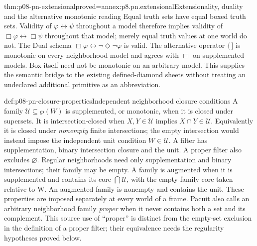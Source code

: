 \begin{hblemma}{thm:p08-pn-extensional}{proved=annex:p8.pn.extensional}{Extensionality, duality and the alternative monotonic reading}
Equal truth sets have equal boxed truth sets. Validity of
\(\varphi\leftrightarrow\psi\) throughout a model therefore
implies validity of \(\Box\varphi\leftrightarrow\Box\psi\)
throughout that model; merely equal truth values at one world do not.
The Dual schema \(\Box\varphi\leftrightarrow\neg\Diamond\neg\varphi\)
is valid. The alternative operator \(\langle\ ]\) is monotonic
on every neighborhood model and agrees with \(\Box\) on supplemented
models. Box itself need not be monotonic on an arbitrary model.
This supplies the semantic bridge to the existing defined-diamond sheets
without treating an undeclared additional primitive as an abbreviation.
\end{hblemma}

\begin{hbdefinition}{def:p08-pn-closure-properties}{Independent neighborhood closure conditions}
A family \(\mathcal U\subseteq\wp(W)\) is supplemented, or
monotonic, when it is closed under supersets. It is intersection-closed
when \(X,Y\in\mathcal U\) implies \(X\cap Y\in\mathcal U\).
Equivalently it is closed under \emph{nonempty} finite intersections;
the empty intersection would instead impose the independent unit
condition \(W\in\mathcal U\).
A filter has supplementation, binary intersection closure and the unit.
A proper filter also excludes \(\varnothing\). Regular neighborhoods
need only supplementation and binary intersections; their family may
be empty. A family is augmented when it is supplemented and contains
its core \(\bigcap\mathcal U\), with the empty-family core taken
relative to W. An augmented family is nonempty and contains the unit.
These properties are imposed separately at every world of a frame.
Pacuit also calls an arbitrary neighborhood family \emph{proper} when
it never contains both a set and its complement. This source use of
``proper'' is distinct from the empty-set exclusion in the definition
of a proper filter; their equivalence needs the regularity hypotheses
proved below.
\end{hbdefinition}

